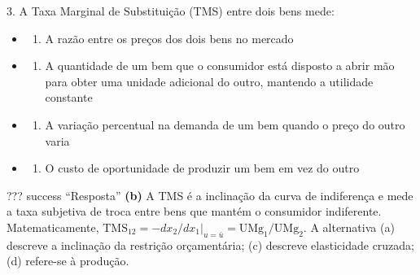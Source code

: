 \documentclass[11pt,twoside,openright]{book}
\providecommand{\tightlist}{\setlength{\itemsep}{0pt}\setlength{\parskip}{0pt}}
\begin{document}
\begin{infobox}{3. A Taxa Marginal de Substituição (TMS) entre dois bens mede:}

\begin{itemize}
\tightlist
\item
  \begin{enumerate}
  \def\labelenumi{(\alph{enumi})}
  \tightlist
  \item
    A razão entre os preços dos dois bens no mercado
  \end{enumerate}
\item
  \begin{enumerate}
  \def\labelenumi{(\alph{enumi})}
  \setcounter{enumi}{1}
  \tightlist
  \item
    A quantidade de um bem que o consumidor está disposto a abrir mão
    para obter uma unidade adicional do outro, mantendo a utilidade
    constante
  \end{enumerate}
\item
  \begin{enumerate}
  \def\labelenumi{(\alph{enumi})}
  \setcounter{enumi}{2}
  \tightlist
  \item
    A variação percentual na demanda de um bem quando o preço do outro
    varia
  \end{enumerate}
\item
  \begin{enumerate}
  \def\labelenumi{(\alph{enumi})}
  \setcounter{enumi}{3}
  \tightlist
  \item
    O custo de oportunidade de produzir um bem em vez do outro
  \end{enumerate}
\end{itemize}

??? success ``Resposta'' \textbf{(b)} A TMS é a inclinação da curva de
indiferença e mede a taxa subjetiva de troca entre bens que mantém o
consumidor indiferente. Matematicamente,
\(\text{TMS}_{12} = -dx_2/dx_1|_{u=\bar{u}} = \text{UMg}_1/\text{UMg}_2\).
A alternativa (a) descreve a inclinação da restrição orçamentária; (c)
descreve elasticidade cruzada; (d) refere-se à produção.

\end{infobox}
\end{document}
